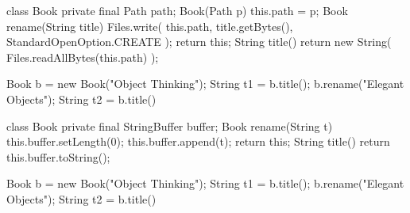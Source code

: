 \documentclass{article}
\begin{document}
\begin{pptWide}{2}
{\scriptsize\begin{ffcode}
class Book {
  private final Path path;
  Book(Path p) { this.path = p; }
  Book rename(String title) {
    Files.write(
      this.path,
      title.getBytes(),
      StandardOpenOption.CREATE
    );
    return this;
  }
  String title() {
    return new String(
      Files.readAllBytes(this.path)
    );
  }
}
\end{ffcode}
}
\par\columnbreak\par
{\small\begin{ffcode}
Book b = new Book("Object Thinking");
String t1 = b.title();
b.rename("Elegant Objects");
String t2 = b.title()
\end{ffcode}
}
\end{pptWide}
\par
\plush{}

\begin{pptWide}{2}
{\small\begin{ffcode}
class Book {
  private final StringBuffer buffer;
  Book rename(String t) {
    this.buffer.setLength(0);
    this.buffer.append(t);
    return this;
  }
  String title() {
    return this.buffer.toString();
  }
}
\end{ffcode}
}
\par\columnbreak\par
{\small\begin{ffcode}
Book b = new Book("Object Thinking");
String t1 = b.title();
b.rename("Elegant Objects");
String t2 = b.title()
\end{ffcode}
}
\end{pptWide}
\par
\plush{}


\end{document}
